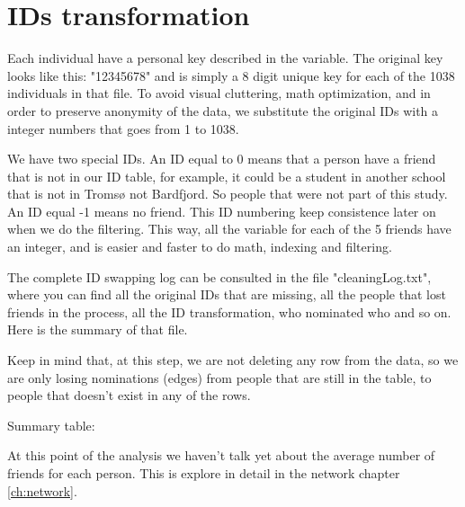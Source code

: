 \section{IDs transformation}

Each individual have a personal key described in the  variable. The original key looks like this: "12345678" and is simply a 8 digit unique key for each of the 1038 individuals in that file. To avoid visual cluttering, math optimization, and in order to preserve anonymity of the data, we substitute the original IDs with a integer numbers that goes from 1 to 1038.\vspace{3 mm}

We have two special IDs. An ID equal to 0 means that a person have a friend that is not in our ID table, for example, it could be a student in another school that is not in Tromsø not Bardfjord. So people that were not part of this study. An ID equal -1 means no friend. This ID numbering keep consistence later on when we do the filtering. This way, all the variable for each of the 5 friends have an integer, and is easier and faster to do math, indexing and filtering.\vspace{3 mm}

The complete ID swapping log can be consulted in the file "cleaningLog.txt", where you can find all the original IDs that are missing, all the people that lost friends in the process, all the ID transformation, who nominated who and so on. Here is the summary of that file.\vspace{3 mm}

Keep in mind that, at this step, we are not deleting any row from the data, so we are only losing nominations (edges) from people that are still in the table, to people that doesn't exist in any of the rows.\vspace{3 mm}


Summary table:\vspace{3 mm}







At this point of the analysis we haven't talk yet about the average number of friends for each person. This is explore in detail in the network chapter \ref{ch:network}.\vspace{3 mm}

